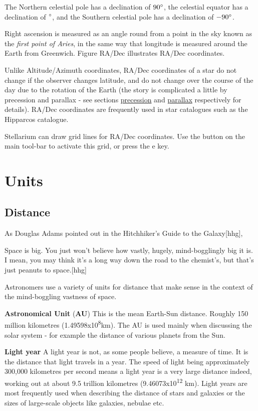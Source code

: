 The Northern celestial pole has a declination of $90\degree$, the celestial
equator has a declination of $\degree$, and the Southern celestial pole has a declination of $-90\degree$.

Right ascension is measured as an angle round from a point in the sky
known as the \emph{first point of Aries}, in the same way that longitude
is measured around the Earth from Greenwich. Figure RA/Dec illustrates
RA/Dec coordinates.

Unlike Altitude/Azimuth coordinates, RA/Dec coordinates of a star do not
change if the observer changes latitude, and do not change over the
course of the day due to the rotation of the Earth (the story is
complicated a little by precession and parallax - see sections
\protect\hyperlink{Precession}{precession} and
\protect\hyperlink{Parallax}{parallax} respectively for details). RA/Dec
coordinates are frequently used in star catalogues such as the Hipparcos
catalogue.

Stellarium can draw grid lines for RA/Dec coordinates. Use the button on
the main tool-bar to activate this grid, or press the e key.

\section{Units}\label{units}

\subsection{Distance}\label{distance}

As Douglas Adams pointed out in the Hitchhiker's Guide to the
Galaxy{[}hhg{]},

Space is big. You just won't believe how vastly, hugely, mind-bogglingly
big it is. I mean, you may think it's a long way down the road to the
chemist's, but that's just peanuts to space.{[}hhg{]}

Astronomers use a variety of units for distance that make sense in the
context of the mind-boggling vastness of space.

\textbf{Astronomical Unit} (\textbf{AU}) This is the mean Earth-Sun
distance. Roughly 150 million kilometres
(1.49598x10\textsuperscript{8}km). The AU is used mainly when discussing
the solar system - for example the distance of various planets from the
Sun.

\textbf{Light year} A light year is not, as some people believe, a
measure of time. It is the distance that light travels in a year. The
speed of light being approximately 300,000 kilometres per second means a
light year is a very large distance indeed, working out at about 9.5
trillion kilometres (9.46073x10\textsuperscript{12} km). Light years are
most frequently used when describing the distance of stars and galaxies
or the sizes of large-scale objects like galaxies, nebulae etc.

